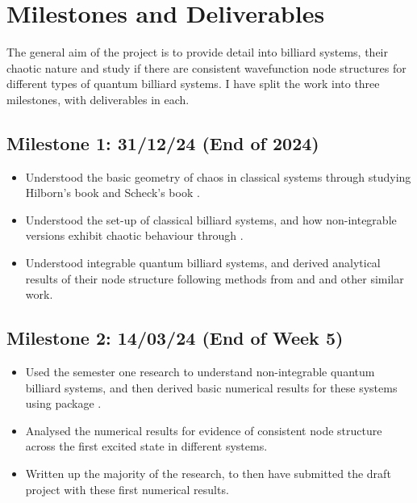 \documentclass[12pt,a4paper]{amsart}
\begin{document}
\section{Milestones and Deliverables}

The general aim of the project is to provide detail into billiard systems, their chaotic nature and study if there are consistent wavefunction node structures for different types of quantum billiard systems. I have split the work into three milestones, with deliverables in each.

\subsection*{Milestone 1: 31/12/24 (End of 2024)}
\begin{itemize}
    \item Understood the basic geometry of chaos in classical systems through studying Hilborn's book \cite{HILBORN} and Scheck's book \cite{SCHECK}.
    \item Understood the set-up of classical billiard systems, and how non-integrable versions exhibit chaotic behaviour through \cite{KORSCH}.
    \item Understood integrable quantum billiard systems, and derived analytical results of their node structure following methods from \cite{ARND} and \cite{CASATI} and other similar work.
\end{itemize}

\subsection*{Milestone 2: 14/03/24 (End of Week 5)}
\begin{itemize}
    \item Used the semester one research to understand non-integrable quantum billiard systems, and then derived basic numerical results for these systems using package \cite{CODE}.
    \item Analysed the numerical results for evidence of consistent node structure across the first excited state in different systems.
    \item Written up the majority of the research, to then have submitted the draft project with these first numerical results.
\end{itemize}
\end{document}
